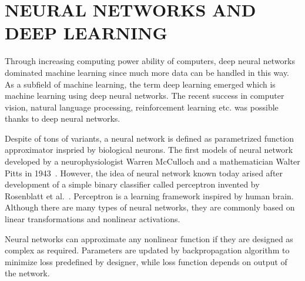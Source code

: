 \chapter{NEURAL NETWORKS AND DEEP LEARNING}
\label{chap:dnns}

Through increasing computing power ability of computers, 
deep neural networks dominated machine learning since much more data can be handled in this way. 
As a subfield of machine learning, the term deep learning emerged which is machine learning using deep neural networks. 
The recent success in computer vision, natural language processing, 
reinforcement learning etc. was possible thanks to deep neural networks. 

Despite of tons of variants, a neural network is defined as parametrized function approximator inspried by biological neurons. 
The first models of neural network developed by a neurophysiologist Warren McCulloch and a mathematician Walter Pitts in 1943~\cite{mcculloch_logical_1943}. 
However, the idea of neural network known today arised after development of a simple binary classifier called perceptron invented by Rosenblatt et al.~\cite{rosenblatt_perceptron_1958}. 
Perceptron is a learning framework inspired by human brain. Although there are many types of neural networks, 
they are commonly based on linear transformations and nonlinear activations.

Neural networks can approximate any nonlinear function if they are designed as complex as required. 
Parameters are updated by backpropagation algorithm to minimize loss  predefined by designer, while loss function depends on output of the network.
